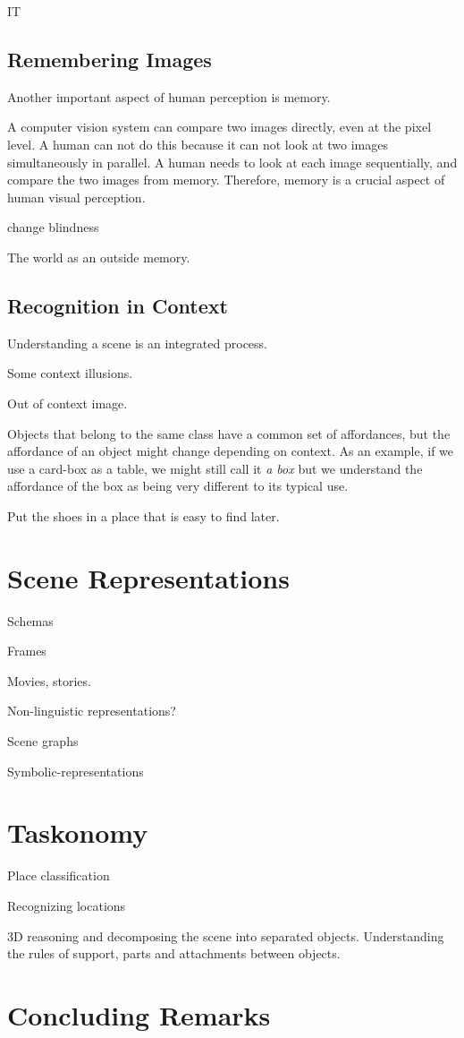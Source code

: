 IT

\subsection{Remembering Images}

Another important aspect of human perception is memory.

A computer vision system can compare two images directly, even at the pixel level. A human can not do this because it can not look at two images simultaneously in parallel. A human needs to look at each image sequentially, and compare the two images from memory. Therefore, memory is a crucial aspect of human visual perception.

change blindness

The world as an outside memory.

\subsection{Recognition in Context}

Understanding a scene is an integrated process.

Some context illusions.

Out of context image.

Objects that belong to the same class have a common set of affordances, but the affordance of an object might change depending on context. As an example, if we use a card-box as a table, we might still call it {\em a box} but we understand the affordance of the box as being very different to its typical use.

Put the shoes in a place that is easy to find later.



\section{Scene Representations}

Schemas

Frames

Movies, stories.


Non-linguistic representations?

Scene graphs

Symbolic-representations


\section{Taskonomy}

Place classification

Recognizing locations

3D reasoning and decomposing the scene into separated objects. Understanding the rules of support, parts and attachments between objects.


\section{Concluding Remarks}

